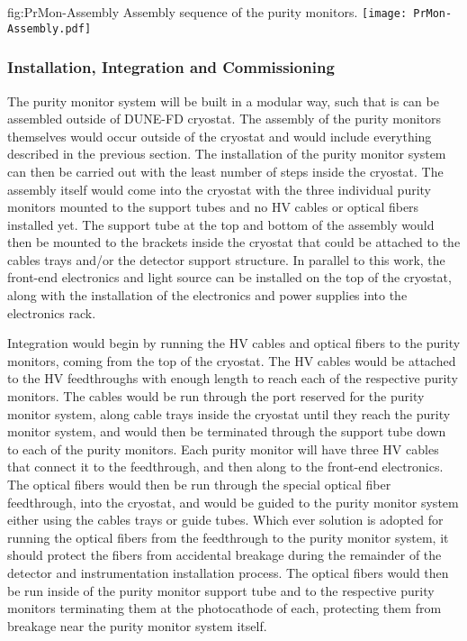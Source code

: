 \begin{dunefigure}{fig:PrMon-Assembly}
  {Assembly sequence of the purity monitors.}
  \texttt{[image: PrMon-Assembly.pdf]}
\end{dunefigure}


\subsubsection{Installation, Integration and Commissioning}
\label{sec:PrMon-Install-Integrate-Commission}
The purity monitor system will be built in a modular way, such that is can be assembled outside of DUNE-FD cryostat.  The assembly of the purity monitors themselves would occur outside of the cryostat and would include everything described in the previous section.  The installation of the purity monitor system can then be carried out with the least number of steps inside the cryostat.  The assembly itself would come into the cryostat with the three individual purity monitors mounted to the support tubes and no HV cables or optical fibers installed yet.  The support tube at the top and bottom of the assembly would then be mounted to the brackets inside the cryostat that could be attached to the cables trays and/or the detector support structure.  In parallel to this work, the front-end electronics and light source can be installed on the top of the cryostat, along with the installation of the electronics and power supplies into the electronics rack.  

Integration would begin by running the HV cables and optical fibers to the purity monitors, coming from the top of the cryostat.  The HV cables would be attached to the HV feedthroughs with enough length to reach each of the respective purity monitors.  The cables would be run through the port reserved for the purity monitor system, along cable trays inside the cryostat until they reach the purity monitor system, and would then be terminated through the support tube down to each of the purity monitors.  Each purity monitor will have three HV cables that connect it to the feedthrough, and then along to the front-end electronics.  The optical fibers would then be run through the special optical fiber feedthrough, into the cryostat, and would be guided to the purity monitor system either using the cables trays or guide tubes.  Which ever solution is adopted for running the optical fibers from the feedthrough to the purity monitor system, it should protect the fibers from accidental breakage during the remainder of the detector and instrumentation installation process.  The optical fibers would then be run inside of the purity monitor support tube and to the respective purity monitors terminating them at the photocathode of each, protecting them from breakage near the purity monitor system itself.

